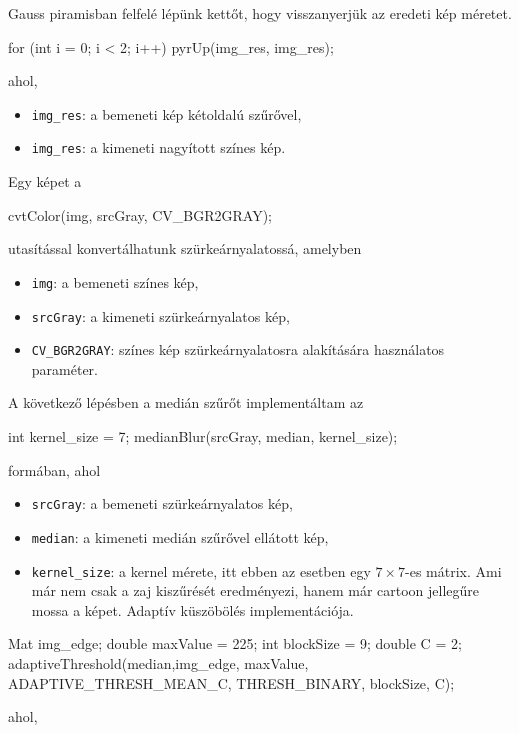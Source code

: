 Gauss piramisban felfelé lépünk kettőt, hogy visszanyerjük az eredeti kép méretet.
\begin{cpp}
for (int i = 0; i < 2; i++) {
    pyrUp(img_res, img_res);
}
\end{cpp}
ahol,
\begin{itemize}
    \item \texttt{img\_res}: a bemeneti kép kétoldalú szűrővel,
    \item \texttt{img\_res}: a kimeneti nagyított színes kép.
\end{itemize}
Egy képet a
\begin{cpp}
cvtColor(img, srcGray, CV_BGR2GRAY);
\end{cpp}
utasítással konvertálhatunk szürkeárnyalatossá, amelyben
\begin{itemize}
    \item \texttt{img}: a bemeneti színes kép,
    \item \texttt{srcGray}: a kimeneti szürkeárnyalatos kép,
    \item \texttt{CV\_BGR2GRAY}: színes kép szürkeárnyalatosra alakítására használatos paraméter.
\end{itemize}
A következő lépésben a medián szűrőt implementáltam az
\begin{cpp}
int kernel_size = 7;
medianBlur(srcGray, median, kernel_size);
\end{cpp}
formában, ahol
\begin{itemize}
    \item \texttt{srcGray}: a bemeneti szürkeárnyalatos kép,
    \item \texttt{median}: a kimeneti medián szűrővel ellátott kép,
    \item \texttt{kernel\_size}: a kernel mérete, itt ebben az esetben egy $7 \times 7$-es mátrix. Ami már nem csak a zaj kiszűrését eredményezi, hanem már cartoon jellegűre mossa a képet.
Adaptív küszöbölés implementációja.
\end{itemize}
\begin{cpp}
Mat img_edge;
double maxValue = 225;
int blockSize = 9;
double C = 2; 
adaptiveThreshold(median,img_edge, maxValue, ADAPTIVE_THRESH_MEAN_C,
		THRESH_BINARY, blockSize, C); 
\end{cpp}
ahol,
